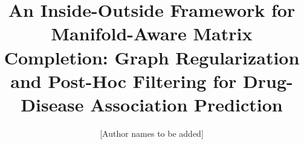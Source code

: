 \documentclass[unnumsec,webpdf,contemporary,large]{oup-authoring-template}
\begin{document}
\journaltitle{}
\DOI{}
\copyrightyear{}
\pubyear{}
\vol{}
\issue{}
\access{}


\title[Manifold-Aware Matrix Completion for Drug Repositioning]{An Inside-Outside Framework for Manifold-Aware Matrix Completion: Graph Regularization and Post-Hoc Filtering for Drug-Disease Association Prediction}

\author[1]{[Author names to be added]}

\address[1]{\orgdiv{[Department]}, \orgname{[Institution]}, \orgaddress{\street{[Street]}, \postcode{[Postcode]}, \state{[State]}, \country{[Country]}}}


\end{document}
